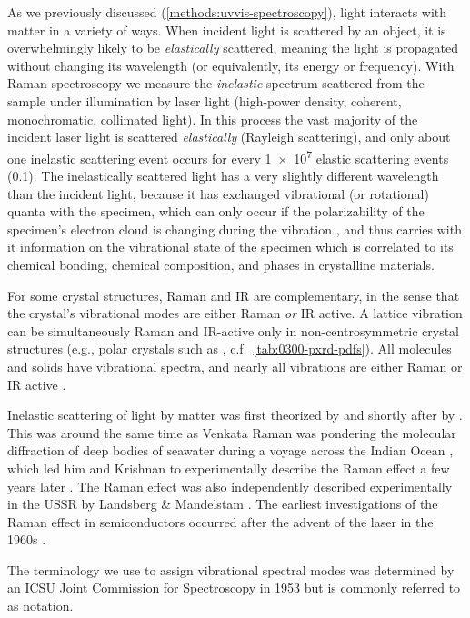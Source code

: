 \documentclass[webedition,openright,titles,swedish,english]{LuaUUThesis}\usepackage[]{graphicx}\usepackage[]{xcolor}
\newcommand{\eg}{e.g.}
\newcommand{\cf}{c.f.}
\begin{document}
As we previously discussed (\cref{methods:uvvis-spectroscopy}), light interacts
with matter in a variety of ways.
When incident light is scattered by an object, it is overwhelmingly likely to
be \emph{elastically} scattered, meaning the light is propagated without changing
its wavelength (or equivalently, its energy or frequency).
With Raman spectroscopy we measure the \emph{inelastic} spectrum scattered from the
sample under illumination by laser light (high-power density, coherent, monochromatic, collimated light).
In this process the vast majority of the incident laser light is scattered
\emph{elastically} (Rayleigh scattering), and only about one inelastic scattering event
occurs for every \num[retain-unity-mantissa=false]{1e7} elastic scattering events (\qty{0.1}{\ppm}).
The inelastically scattered light has a very slightly different wavelength than the incident light,
because it has exchanged vibrational (or rotational) quanta with the specimen, which
can only occur if the polarizability of the specimen's electron cloud is changing
during the vibration \cite{Rahman2020a}, and thus carries with it information on the vibrational state
of the specimen which is correlated to its chemical bonding, chemical composition,
and phases in crystalline materials.

For some crystal structures, Raman and \gls{IR} are complementary, in the sense
that the crystal's vibrational modes are either Raman \emph{or} \gls{IR} active.
A lattice vibration can be simultaneously Raman and \gls{IR}-active only in
non-centrosymmetric crystal structures (\eg, polar crystals such as \ZnO,
\cf\ \cref{tab:0300-pxrd-pdfs}).
All molecules and solids have vibrational spectra, and nearly all vibrations
are either Raman or \gls{IR} active \cite{Dyer2005}.

Inelastic scattering of light by matter was first theorized by \textcite{Smekal1923} and
shortly after by \textcite{Kramers1924,Kramers1924a,Kramers1925}. This was around
the same time as Venkata Raman was pondering the molecular diffraction of deep bodies
of seawater during a voyage across the Indian Ocean \cite{Raman1922},
which led him and Krishnan to experimentally describe the Raman effect a few years later
\cite{Raman1928,Raman1928a}. The Raman effect was also independently described
experimentally in the USSR by Landsberg \& Mandelstam \cite{Landsberg1928,Landsberg1928a}.
The earliest investigations of the Raman effect in semiconductors occurred after
the advent of the laser in the 1960s \cite{Cardona1974}.

The terminology we use to assign vibrational spectral modes was determined
by an ICSU Joint Commission for Spectroscopy in 1953 \cite{Cohen2008} but is
commonly referred to as \textcite{Mulliken1930,Mulliken1955,Mulliken1956} notation.
\end{document}
